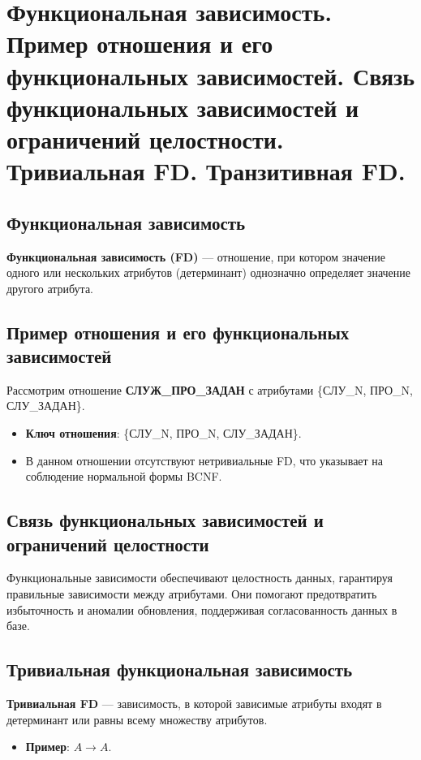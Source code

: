 \documentclass[a4paper,12pt]{article}
\begin{document}
\section{Функциональная зависимость. Пример отношения и его функциональных зависимостей. Связь функциональных зависимостей и ограничений целостности. Тривиальная FD. Транзитивная FD.}

\subsection{Функциональная зависимость}

\textbf{Функциональная зависимость (FD)} — отношение, при котором значение одного или нескольких атрибутов (детерминант) однозначно определяет значение другого атрибута.

\subsection{Пример отношения и его функциональных зависимостей}

Рассмотрим отношение \textbf{СЛУЖ\_ПРО\_ЗАДАН} с атрибутами \{СЛУ\_N, ПРО\_N, СЛУ\_ЗАДАН\}.

\begin{itemize}
    \item \textbf{Ключ отношения}: \{СЛУ\_N, ПРО\_N, СЛУ\_ЗАДАН\}.
    \item В данном отношении отсутствуют нетривиальные FD, что указывает на соблюдение нормальной формы BCNF.
\end{itemize}

\subsection{Связь функциональных зависимостей и ограничений целостности}

Функциональные зависимости обеспечивают целостность данных, гарантируя правильные зависимости между атрибутами. Они помогают предотвратить избыточность и аномалии обновления, поддерживая согласованность данных в базе.

\subsection{Тривиальная функциональная зависимость}

\textbf{Тривиальная FD} — зависимость, в которой зависимые атрибуты входят в детерминант или равны всему множеству атрибутов.

\begin{itemize}
    \item \textbf{Пример}: $A \rightarrow A$.
\end{itemize}
\end{document}
